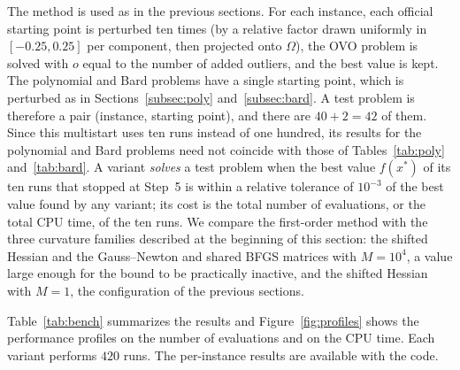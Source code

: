 \documentclass[11pt]{article}
\begin{document}
The method is used as in the previous sections. For each instance, each
official starting point is perturbed ten times (by a relative factor drawn
uniformly in $[-0.25, 0.25]$ per component, then projected onto $\Omega$), the
OVO problem is solved with $o$ equal to the number of added outliers, and the
best value is kept. The polynomial and Bard problems have a single starting
point, which is perturbed as in Sections~\ref{subsec:poly}
and~\ref{subsec:bard}. A test problem is therefore a pair (instance, starting
point), and there are $40 + 2 = 42$ of them. Since this multistart uses ten
runs instead of one hundred, its results for the polynomial and Bard problems
need not coincide with those of Tables~\ref{tab:poly} and~\ref{tab:bard}. A variant \emph{solves} a test problem when
the best value $f(x^*)$ of its ten runs that stopped at Step~5 is within a
relative tolerance of $10^{-3}$ of the best value found by any variant; its
cost is the total number of evaluations, or the total CPU time, of the ten
runs. We compare the first-order method with the three curvature families
described at the beginning of this section: the shifted Hessian and the
Gauss--Newton and shared BFGS matrices with $M = 10^4$, a value large enough
for the bound to be practically inactive, and the shifted Hessian with $M = 1$,
the configuration of the previous sections.

Table~\ref{tab:bench} summarizes the results and Figure~\ref{fig:profiles}
shows the performance profiles \cite{dolanmore} on the number of evaluations and
on the CPU time. Each variant performs $420$ runs. The per-instance results are
available with the code.
\end{document}
